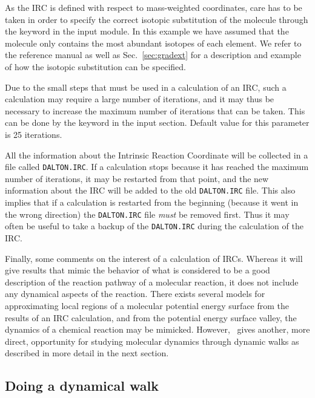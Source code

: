 As the IRC is defined with respect to mass-weighted
coordinates, care
has to be taken in order to specify the correct isotopic substitution
of the molecule through the keyword  in the
 input module. In this example we have assumed that the
molecule only contains the most abundant isotopes of each element. We
refer to the reference manual as well as Sec.~\ref{sec:gradext} for a
description and example of how the isotopic substitution can be specified.

Due to the small steps that must be used in a calculation of an IRC,
such a calculation may require a large number of
iterations, and it
may thus be necessary to increase the maximum number of iterations
that can be taken.  This can be done by
the keyword  in the  input
section. Default value for this parameter is 25 iterations.

All the information about the Intrinsic Reaction Coordinate will be
collected in a file called \texttt{DALTON.IRC}. If a
calculation stops
because it has reached the maximum number of iterations, it may be
restarted from that point, and the new information about the IRC will
be added to the old \texttt{DALTON.IRC} file. This also implies that if a
calculation is restarted from the beginning (because it went in the
wrong direction) the \texttt{DALTON.IRC} file {\em must\/} be removed
first. Thus it may often be useful to take a backup of the
\texttt{DALTON.IRC} during the calculation of the IRC.

Finally, some comments on the interest of a calculation of IRCs.
Whereas it will give results that mimic the behavior of what is
considered to be a good description of the reaction
pathway of a
molecular reaction, it does not include any dynamical aspects of the
reaction. There exists several models for approximating local regions of a
molecular potential energy surface from the results of an IRC
calculation, and from the
potential energy surface valley, the dynamics of a
chemical reaction may be
mimicked. However, \dalton\ gives another, more direct, opportunity
for studying molecular dynamics through dynamic walks as described in
more detail in the next section.

\subsection{Doing a dynamical walk}\label{sec:dynamic}

